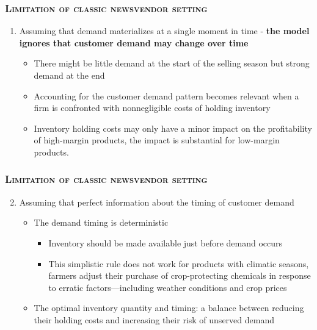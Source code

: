 \documentclass[aspectratio=169]{../presentation}
\begin{document}
    \begin{frame}
        \frametitle{\textsc{Limitation of classic newsvendor setting}}

        \begin{enumerate}
            \item Assuming that demand materializes at a single moment in time - \textbf{the model ignores that customer demand may change over time}

            \begin{itemize}
                \item There might be little demand at the start of the selling season but strong demand at the end
                \item Accounting for the customer demand pattern becomes relevant when a firm is confronted with nonnegligible costs of holding inventory
                \item Inventory holding costs may only have a minor impact on the profitability of high-margin products, the impact is substantial for low-margin products.
            \end{itemize}
        \end{enumerate}

    \end{frame}

    \begin{frame}
        \frametitle{\textsc{Limitation of classic newsvendor setting}}

        \begin{enumerate}
            \setcounter{enumi}{1}
            \item Assuming that perfect information about the timing of customer demand

            \begin{itemize}
                \item The demand timing is deterministic

                \begin{itemize}
                    \item Inventory should be made available just before demand occurs
                    \item This simplistic rule does not work for products with climatic seasons, farmers adjust their purchase of crop-protecting chemicals in response to erratic factors—including weather conditions and crop prices
                \end{itemize}

                \item The optimal inventory quantity and timing: a balance between reducing their holding costs and increasing their risk of unserved demand
            \end{itemize}
        \end{enumerate}

    \end{frame}
\end{document}
